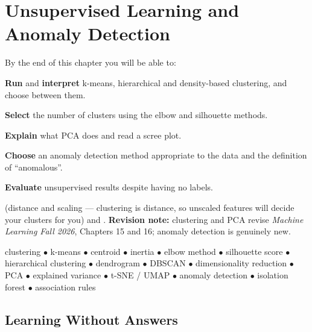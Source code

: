 \chapter{Unsupervised Learning and Anomaly Detection}\label{ch:unsupervised}

\begin{outcomes}
By the end of this chapter you will be able to:
\begin{tight}
  \item \textbf{Run} and \textbf{interpret} k-means, hierarchical and density-based clustering, and choose between them.
  \item \textbf{Select} the number of clusters using the elbow and silhouette methods.
  \item \textbf{Explain} what PCA does and read a scree plot.
  \item \textbf{Choose} an anomaly detection method appropriate to the data and the definition of ``anomalous''.
  \item \textbf{Evaluate} unsupervised results despite having no labels.
\end{tight}
\end{outcomes}

\begin{prereq}
 (distance and scaling --- clustering is distance, so unscaled features
will decide your clusters for you) and . \textbf{Revision
note:} clustering and PCA revise \emph{Machine Learning Fall 2026}, Chapters 15
and 16; anomaly detection is genuinely new.
\end{prereq}

\begin{keyterms}
clustering $\bullet$ k-means $\bullet$ centroid $\bullet$ inertia $\bullet$ elbow
method $\bullet$ silhouette score $\bullet$ hierarchical clustering $\bullet$
dendrogram $\bullet$ DBSCAN $\bullet$ dimensionality reduction $\bullet$ PCA
$\bullet$ explained variance $\bullet$ t-SNE / UMAP $\bullet$ anomaly detection
$\bullet$ isolation forest $\bullet$ association rules
\end{keyterms}

\section{Learning Without Answers}

